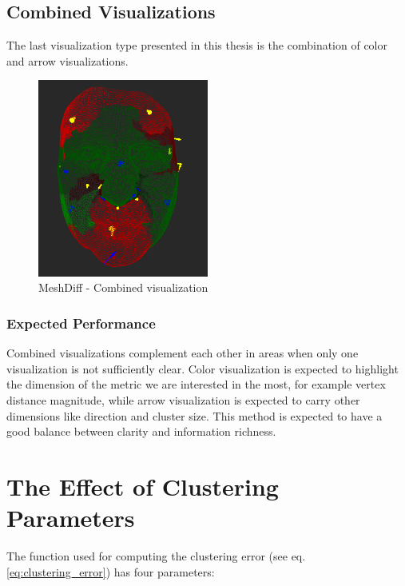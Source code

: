 \subsection{Combined Visualizations}

The last visualization type presented in this thesis is the combination of color and arrow visualizations.

\begin{figure}[h]
\centering
\includegraphics[width=0.5\textwidth]{./img/meshdiff-combination.PNG}
\caption{MeshDiff - Combined visualization}
\label{fig:meshdiff_combination}
\end{figure}

\subsubsection{Expected Performance}

Combined visualizations complement each other in areas when only one visualization is not sufficiently clear. Color visualization is expected to highlight the dimension of the metric we are interested in the most, for example vertex distance magnitude, while arrow visualization is expected to carry other dimensions like direction and cluster size. This method is expected to have a good balance between clarity and information richness.
\section{The Effect of Clustering Parameters}
\label{sec:parameter_effect}

The function used for computing the clustering error (see eq. \ref{eq:clustering_error}) has four parameters:

